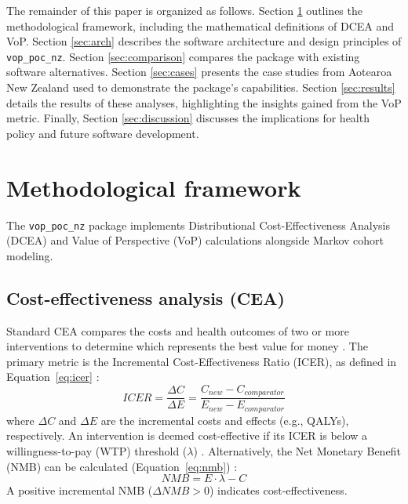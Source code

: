 \documentclass[article]{jss}
\newcommand{\pkg}[1]{\texttt{#1}}
\begin{document}
The remainder of this paper is organized as follows. Section \ref{sec:methods} outlines the methodological framework, including the mathematical definitions of DCEA and VoP. Section \ref{sec:arch} describes the software architecture and design principles of \pkg{vop\_poc\_nz}. Section \ref{sec:comparison} compares the package with existing software alternatives. Section \ref{sec:cases} presents the case studies from Aotearoa New Zealand used to demonstrate the package's capabilities. Section \ref{sec:results} details the results of these analyses, highlighting the insights gained from the VoP metric. Finally, Section \ref{sec:discussion} discusses the implications for health policy and future software development.

\section{Methodological framework} \label{sec:methods}

The \pkg{vop\_poc\_nz} package implements Distributional Cost-Effectiveness Analysis (DCEA) and Value of Perspective (VoP) calculations alongside Markov cohort modeling.

\subsection{Cost-effectiveness analysis (CEA)}
Standard CEA compares the costs and health outcomes of two or more interventions to determine which represents the best value for money \citep{drummond2015}.
The primary metric is the Incremental Cost-Effectiveness Ratio (ICER), as defined in Equation~\ref{eq:icer} \citep{drummond2015}:
\begin{equation} \label{eq:icer}
ICER = \frac{\Delta C}{\Delta E} = \frac{C_{new} - C_{comparator}}{E_{new} - E_{comparator}}
\end{equation}
where $\Delta C$ and $\Delta E$ are the incremental costs and effects (e.g., QALYs), respectively.
An intervention is deemed cost-effective if its ICER is below a willingness-to-pay (WTP) threshold ($\lambda$) \citep{claxton2010}.
Alternatively, the Net Monetary Benefit (NMB) can be calculated (Equation~\ref{eq:nmb}) \citep{drummond2015}:
\begin{equation} \label{eq:nmb}
NMB = E \cdot \lambda - C
\end{equation}
A positive incremental NMB ($\Delta NMB > 0$) indicates cost-effectiveness.
\end{document}
